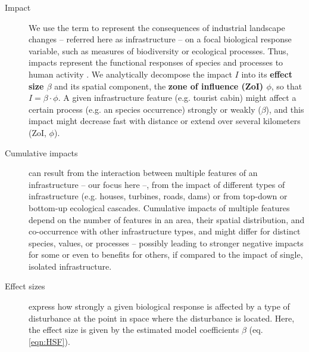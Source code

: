 \documentclass[titlepage]{article}
\begin{document}
\begin{tcolorbox}[width=1.3\textwidth,center,colback=yellow!5,colframe=yellow!75!black,title={Box 1 -- Definitions}]

\begin{description}

    \item[Impact] We use the term to represent the consequences of industrial landscape changes -- referred here as infrastructure -- on a focal biological response variable, such as measures of biodiversity or ecological processes. Thus, impacts represent the functional responses of species and processes to human activity \citep{naugle_unifying_2011}. We analytically decompose the impact $I$ into its \textbf{effect size $\beta$} and its spatial component, the \textbf{zone of influence (ZoI) $\phi$}, so that $I = \beta \cdot \phi$. A given infrastructure feature (e.g. tourist cabin) might affect a certain process (e.g. an species occurrence) strongly or weakly ($\beta$), and this impact might decrease fast with distance or extend over several kilometers (ZoI, $\phi$).
    
    \item[Cumulative impacts] can result from the interaction between multiple features of an infrastructure -- our focus here --, from the impact of different types of infrastructure (e.g. houses, turbines, roads, dams) or from top-down or bottom-up ecological cascades. Cumulative impacts of multiple features depend on the number of features in an area, their spatial distribution, and co-occurrence with other infrastructure types, and might differ for distinct species, values, or processes -- possibly leading to stronger negative impacts for some or even to benefits for others, if compared to the impact of single, isolated infrastructure.
    
    \item[Effect sizes] express how strongly a given biological response is affected by a type of disturbance at the point in space where the disturbance is located. Here, the effect size is given by the estimated model coefficients $\beta$ (eq. \ref{eqn:HSF}).
    

\end{description}
\end{tcolorbox}
\end{document}

